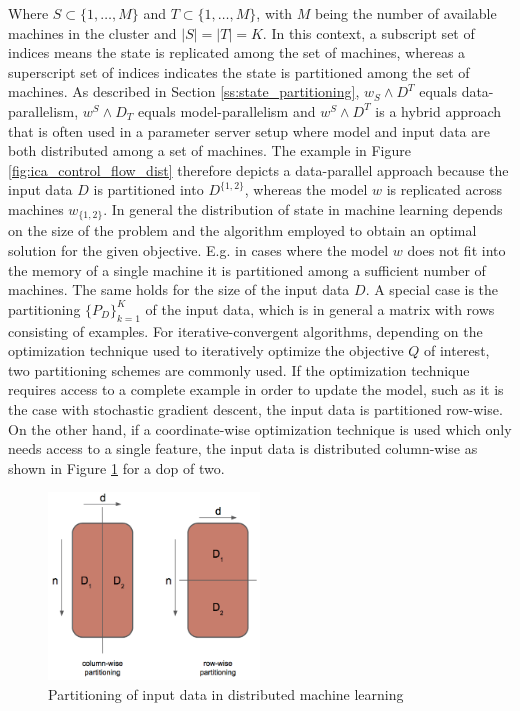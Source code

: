 Where $S \subset \{1, \ldots, M\}$ and $T \subset \{1, \ldots, M\}$, with $M$ being the number of available machines in the cluster and $\mid S \mid = \mid T \mid = K$.
In this context, a subscript set of indices means the state is replicated among the set of machines, whereas a superscript set of indices indicates the state is partitioned among the set of machines.
As described in Section \ref{ss:state_partitioning}, $w_S \wedge D^T$ equals data-parallelism, $w^S \wedge D_T$ equals model-parallelism and $w^S \wedge D^T$ is a hybrid approach that is often used in a parameter server setup where model and input data are both distributed among a set of machines.
The example in Figure \ref{fig:ica_control_flow_dist} therefore depicts a data-parallel approach because the input data $D$ is partitioned into $D^{\{1,2\}}$, whereas the model $w$ is replicated across machines $w_{\{1,2\}}$.
In general the distribution of state in machine learning depends on the size of the problem and the algorithm employed to obtain an optimal solution for the given objective.
E.g. in cases where the model $w$ does not fit into the memory of a single machine it is partitioned among a sufficient number of machines.
The same holds for the size of the input data $D$.
A special case is the partitioning $\{P_D\}_{k=1}^K$ of the input data, which is in general a matrix with rows consisting of examples.
For iterative-convergent algorithms, depending on the optimization technique used to iteratively optimize the objective $Q$ of interest, two partitioning schemes are commonly used.
If the optimization technique requires access to a complete example in order to update the model, such as it is the case with stochastic gradient descent, the input data is partitioned row-wise.
On the other hand, if a coordinate-wise optimization technique is used which only needs access to a single feature, the input data is distributed column-wise as shown in Figure \ref{fig:row_col_dist} for a dop of two.
\begin{figure}[ht]
\centering
\includegraphics[width=0.5\textwidth]{img/row_col_dist.png}
\caption{Partitioning of input data in distributed machine learning}
\label{fig:row_col_dist}
\end{figure}

